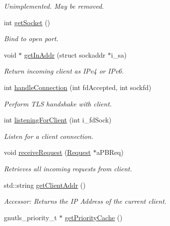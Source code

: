 \begin{DoxyCompactItemize}
\begin{DoxyCompactList}\small\item\em Unimplemented. May be removed. \end{DoxyCompactList}\item 
int \hyperlink{classGTBCommunication_a92ae038bbe4b05f7f17d9b9f59d6c158}{get\-Socket} ()
\begin{DoxyCompactList}\small\item\em Bind to open port. \end{DoxyCompactList}\item 
void $\ast$ \hyperlink{classGTBCommunication_a7d2a3e93ca5ba8a880fea467d2d8b325}{get\-In\-Addr} (struct sockaddr $\ast$i\-\_\-sa)
\begin{DoxyCompactList}\small\item\em Return incoming client as I\-Pv4 or I\-Pv6. \end{DoxyCompactList}\item 
int \hyperlink{classGTBCommunication_a6353b9cc417d4f7a3fd309fc911cf8f1}{handle\-Connection} (int fd\-Accepted, int sockfd)
\begin{DoxyCompactList}\small\item\em Perform T\-L\-S handshake with client. \end{DoxyCompactList}\item 
int \hyperlink{classGTBCommunication_a2f5260afdc69079471e21fd855e7dcc3}{listening\-For\-Client} (int i\-\_\-fd\-Sock)
\begin{DoxyCompactList}\small\item\em Listen for a client connection. \end{DoxyCompactList}\item 
void \hyperlink{classGTBCommunication_a0a4e58a46cc8f6037439473442b474b6}{receive\-Request} (\hyperlink{classRequest}{Request} $\ast$a\-P\-B\-Req)
\begin{DoxyCompactList}\small\item\em Retrieves all incoming requests from client. \end{DoxyCompactList}\item 
std\-::string \hyperlink{classGTBCommunication_a0767f8f014450f4ba30d6be2db74086a}{get\-Client\-Addr} ()
\begin{DoxyCompactList}\small\item\em Accessor\-: Returns the I\-P Address of the current client. \end{DoxyCompactList}\item 
gnutls\-\_\-priority\-\_\-t $\ast$ \hyperlink{classGTBCommunication_ac40042c1dd24bb71f730eae70c0dfc06}{get\-Priority\-Cache} ()

\end{DoxyCompactItemize}
